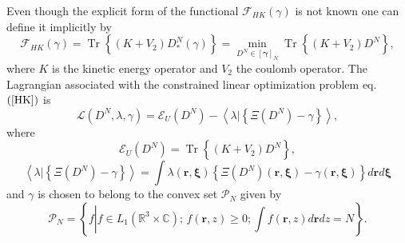 \documentclass[aps,preprint]{revtex4}%
\begin{document}
Even though the explicit form of the functional $\mathcal{F}_{HK}\left(
\gamma\right)  $ is not known one can define it implicitly \cite{LevyLieb} by
\begin{equation}
\mathcal{F}_{HK}\left(  \gamma\right)  =\operatorname{Tr}\left\{
\overset{}{\left(  K+V_{2}\right)  D_{\ast}^{N}\left(  \gamma\right)
}\right\}  =\min_{D^{N}\in\left[  \mathbf{\gamma}\right]  _{N}}%
\operatorname{Tr}\left\{  \overset{}{\left(  K+V_{2}\right)  D^{N}}\right\}  ,
\label{HK}%
\end{equation}
where $K$ is the kinetic energy operator and $V_{2}$ the coulomb operator. The
Lagrangian associated with the constrained linear optimization problem eq.
$\left(  \ref{HK}\right)  $ is
\begin{equation}
\mathcal{L}\left(  D^{N},\lambda,\gamma\right)  =\mathcal{E}_{U}\left(
D^{N}\right)  -\left\langle \left.  \lambda\right\vert \left\{  \Xi\left(
D^{N}\right)  -\gamma\right\}  \right\rangle ,
\end{equation}
where%
\begin{equation}
\mathcal{E}_{U}\left(  D^{N}\right)  =\operatorname{Tr}\left\{
\overset{}{\left(  K+V_{2}\right)  D^{N}}\right\}  ,
\end{equation}%
\begin{equation}
\left\langle \left.  \lambda\right\vert \left\{  \Xi\left(  D^{N}\right)
-\gamma\right\}  \right\rangle =\int\lambda\left(  \mathbf{r,\xi}\right)
\left\{  \Xi\left(  D^{N}\right)  \left(  \mathbf{r,\xi}\right)
-\gamma\left(  \mathbf{r,\xi}\right)  \right\}  d\mathbf{r}d\mathbf{\xi}%
\end{equation}
and $\gamma$ is chosen to belong to the convex set $\mathcal{P}_{N}$ given by
\begin{equation}
\mathcal{P}_{N}=\left\{  f\left\vert f\in L_{1}\left(  \mathbb{R}^{3}%
\times\mathbb{C}\right)  ;\,f\left(  \mathbf{r,}z\right)  \geq0;\int f\left(
\mathbf{r,}z\right)  d\mathbf{r}dz=N\right.  \right\}  .
\end{equation}
\end{document}
